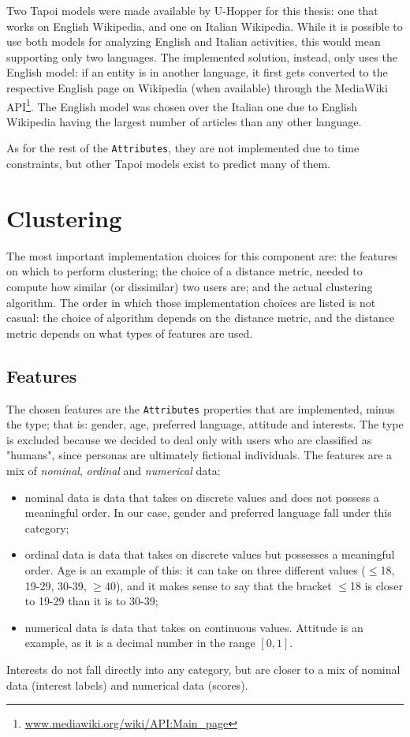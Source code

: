 Two Tapoi models were made available by U-Hopper for this thesis: one that works on English Wikipedia, and one on Italian Wikipedia. While it is possible to use both models for analyzing English and Italian activities, this would mean supporting only two languages. The implemented solution, instead, only uses the English model: if an entity is in another language, it first gets converted to the respective English page on Wikipedia (when available) through the MediaWiki API\footnote{\url{www.mediawiki.org/wiki/API:Main_page}}. The English model was chosen over the Italian one due to English Wikipedia having the largest number of articles than any other language.

As for the rest of the \texttt{Attributes}, they are not implemented due to time constraints, but other Tapoi models exist to predict many of them.

\section{Clustering}
The most important implementation choices for this component are: the features on which to perform clustering; the choice of a distance metric, needed to compute how similar (or dissimilar) two users are; and the actual clustering algorithm. The order in which those implementation choices are listed is not casual: the choice of algorithm depends on the distance metric, and the distance metric depends on what types of features are used.

\subsection{Features}
The chosen features are the \texttt{Attributes} properties that are implemented, minus the type; that is: gender, age, preferred language, attitude and interests. The type is excluded because we decided to deal only with users who are classified as "humans", since personas are ultimately fictional individuals. The features are a mix of \emph{nominal}, \emph{ordinal} and \emph{numerical} data:
\begin{itemize}
    \item nominal data is data that takes on discrete values and does not possess a meaningful order. In our case, gender and preferred language fall under this category;
    \item ordinal data is data that takes on discrete values but possesses a meaningful order. Age is an example of this: it can take on three different values ($\leq$18, 19-29, 30-39, $\geq$40), and it makes sense to say that the bracket $\leq$18 is closer to 19-29 than it is to 30-39;
    \item numerical data is data that takes on continuous values. Attitude is an example, as it is a decimal number in the range $[0,1]$.
\end{itemize}
Interests do not fall directly into any category, but are closer to a mix of nominal data (interest labels) and numerical data (scores).

